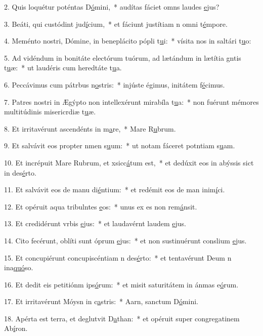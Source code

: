 2. Quis loquétur poténtas D\uline{ó}mini,~* audítas fáciet omns laudes \uline{e}jus?\par 
3. Beáti, qui custódint jud\uline{í}cium,~* et fáciunt justítiam n omni t\uline{é}mpore.\par 
4. Meménto nostri, Dómine, in beneplácito pópli t\uline{u}i:~* vísita nos in saltári t\uline{u}o:\par 
5. Ad vidéndum in bonitáte electórum tuórum, ad lætándum in lætítia gntis t\uline{u}æ:~* ut laudéris cum heredtáte t\uline{u}a.\par 
6. Peccávimus cum pátrbus n\uline{o}stris:~* injúste égimus, initátem f\uline{é}cimus.\par 
7. Patres nostri in Ægýpto non intellexérunt mirabíla t\uline{u}a:~* non fuérunt mémores multitúdinis misericrdiæ t\uline{u}æ.\par 
8. Et irritavérunt ascendénts in m\uline{a}re,~* Mare R\uline{u}brum.\par 
9. Et salvávit eos propter nmen s\uline{u}um:~* ut notam fáceret potntiam s\uline{u}am.\par 
10. Et incrépuit Mare Rubrum, et xsicc\uline{á}tum est,~* et dedúxit eos in abýssis sict in des\uline{é}rto.\par 
11. Et salvávit eos de manu di\uline{é}ntium:~* et redémit eos de man inim\uline{í}ci.\par 
12. Et opéruit aqua tribulntes \uline{e}os:~* unus ex es non rem\uline{á}nsit.\par 
13. Et credidérunt vrbis \uline{e}jus:~* et laudavérnt laudem \uline{e}jus.\par 
14. Cito fecérunt, oblíti sunt óprum \uline{e}jus:~* et non sustinuérunt conslium \uline{e}jus.\par 
15. Et concupiérunt concupiscéntiam n des\uline{é}rto:~* et tentavérunt Deum n ina\uline{quó}so.\par 
16. Et dedit eis petitiónm ips\uline{ó}rum:~* et misit saturitátem in ánmas e\uline{ó}rum.\par 
17. Et irritavérunt Móysn in c\uline{a}stris:~* Aarn, sanctum D\uline{ó}mini.\par 
18. Apérta est terra, et deglutvit D\uline{a}than:~* et opéruit super congregatinem Ab\uline{í}ron.\par 
